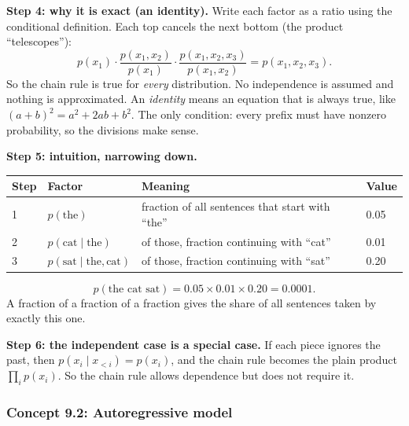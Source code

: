 \documentclass[12pt,a4paper]{article}
\begin{document}
\textbf{Step 4: why it is exact (an identity).} Write each factor as a ratio using the conditional definition. Each top cancels the next bottom (the product ``telescopes''):
\[
p(x_1)\cdot\frac{p(x_1,x_2)}{p(x_1)}\cdot\frac{p(x_1,x_2,x_3)}{p(x_1,x_2)}=p(x_1,x_2,x_3).
\]
So the chain rule is true for \emph{every} distribution. No independence is assumed and nothing is approximated. An \emph{identity} means an equation that is always true, like $(a+b)^2=a^2+2ab+b^2$. The only condition: every prefix must have nonzero probability, so the divisions make sense.

\textbf{Step 5: intuition, narrowing down.}
\begin{center}
\begin{tabular}{@{}llll@{}}
\toprule
Step & Factor & Meaning & Value \\
\midrule
1 & $p(\text{the})$ & fraction of all sentences that start with ``the'' & 0.05 \\
2 & $p(\text{cat}\mid\text{the})$ & of those, fraction continuing with ``cat'' & 0.01 \\
3 & $p(\text{sat}\mid\text{the},\text{cat})$ & of those, fraction continuing with ``sat'' & 0.20 \\
\bottomrule
\end{tabular}
\end{center}
\[
p(\text{the cat sat})=0.05\times0.01\times0.20=0.0001 .
\]
A fraction of a fraction of a fraction gives the share of all sentences taken by exactly this one.

\textbf{Step 6: the independent case is a special case.} If each piece ignores the past, then $p(x_i\mid x_{<i})=p(x_i)$, and the chain rule becomes the plain product $\prod_ip(x_i)$. So the chain rule allows dependence but does not require it.

\subsubsection{Concept 9.2: Autoregressive model}\label{c9-2}
\end{document}
